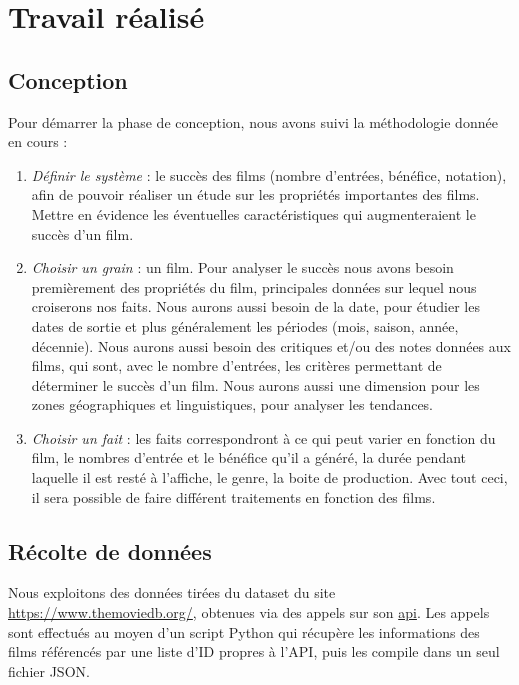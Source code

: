 \chapter{Travail réalisé}

\section{Conception}
Pour démarrer la phase de conception, nous avons suivi la méthodologie donnée en cours :
\begin{enumerate}
\item \emph{Définir le système} : le succès des films (nombre d'entrées, bénéfice, notation), afin de pouvoir réaliser un étude sur les propriétés importantes des films. Mettre en évidence les éventuelles caractéristiques qui augmenteraient le succès d’un film.

\item \emph{Choisir un grain} : un film.
Pour analyser le succès nous avons besoin premièrement des propriétés du film, principales données sur lequel nous croiserons nos faits. Nous aurons aussi besoin de la date, pour étudier les dates de sortie et plus généralement les périodes (mois, saison, année, décennie). Nous aurons aussi besoin des critiques et/ou des notes données aux films, qui sont, avec le nombre d’entrées, les critères permettant de déterminer le succès d’un film. Nous aurons aussi une dimension pour les zones géographiques et linguistiques, pour analyser les tendances.

\item \emph{Choisir un fait} : les faits correspondront à ce qui peut varier en fonction du film, le nombres d'entrée et le bénéfice qu’il a généré, la durée pendant laquelle il est resté à l'affiche, le genre, la boite de production. Avec tout ceci, il sera possible de faire différent traitements en fonction des films.
\end{enumerate}

\section{Récolte de données}

Nous exploitons des données tirées du dataset du site \url{https://www.themoviedb.org/}, obtenues via des appels sur son \href{https://www.themoviedb.org/documentation/api}{api}. Les appels sont effectués au moyen d'un script Python qui récupère les informations des films référencés par une liste d'ID propres à l'API, puis les compile dans un seul fichier JSON.

